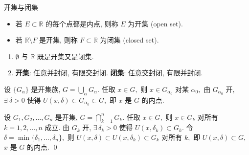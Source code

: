 \begin{frame}{开集与闭集}

\begin{Def}[开集与闭集]
\begin{itemize}
\item 若 $E \subset \mathbb{R}$ 的每个点都是内点, 则称 $E$ 为\alert{开集} (open set).
\item 若 $\mathbb{R} \setminus F$ 是开集, 则称 $F \subset \mathbb{R}$ 为\alert{闭集} (closed set).
\end{itemize}
\end{Def}

\pause

\begin{prop}[运算性质]
\begin{enumerate}
\item $\emptyset$ 与 $\mathbb{R}$ 既是开集又是闭集.
\item \textbf{开集}: 任意并封闭, 有限交封闭. \quad \textbf{闭集}: 任意交封闭, 有限并封闭.
\end{enumerate}
\end{prop}

\pause

\startproof[bg=yellow, fg=red]
设 $\{G_\alpha\}$ 是开集族, $G = \bigcup_\alpha G_\alpha.$ 任取 $x \in G,$ 则 $x \in G_{\alpha_0}$ 对某 $\alpha_0,$ 由 $G_{\alpha_0}$ 开, $\exists ~ \delta > 0$ 使得 $U(x, \delta) \subset G_{\alpha_0} \subset G,$ 即 $x$ 是 $G$ 的内点.

\pause
\vspace{0.5em}

设 $G_1, G_2, \ldots, G_n$ 是开集, $G = \bigcap_{k=1}^n G_k.$ 任取 $x \in G,$ 则 $x \in G_k$ 对所有 $k=1,2,\ldots,n$ 成立. 由 $G_k$ 开, $\exists\, \delta_k > 0$ 使得 $U(x, \delta_k) \subset G_k.$ 令 $\delta = \min\{\delta_1, \ldots, \delta_n\},$ 则 $U(x, \delta) \subset U(x, \delta_k) \subset G_k$ 对所有 $k,$ 即 $U(x, \delta) \subset G,$ $x$ 是 $G$ 的内点.
\qed

\end{frame}


